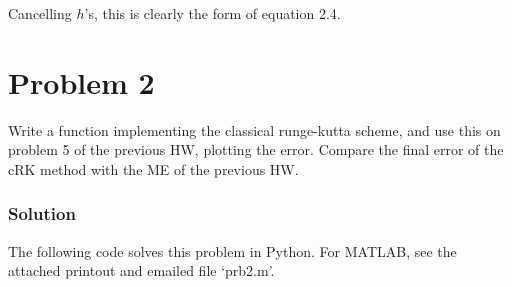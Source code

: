 \documentclass[letterpaper,10pt,english]{/Library/Python/2.7/site-packages/Sphinx-1.2-py2.7.egg/sphinx/texinputs/sphinxhowto}
\begin{document}
Cancelling $h$'s, this is clearly the form of equation 2.4.\section{Problem 2}Write a function implementing the classical runge-kutta scheme, and use
this on problem 5 of the previous HW, plotting the error. Compare the
final error of the cRK method with the ME of the previous HW.\subsubsection*{Solution}The following code solves this problem in Python. For MATLAB, see the
attached printout and emailed file `prb2.m'.

\end{document}
